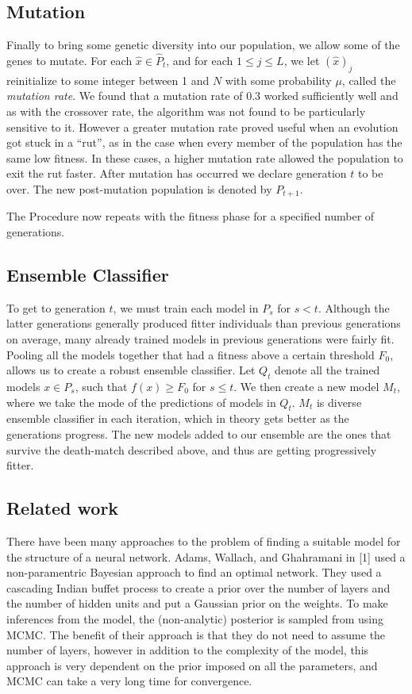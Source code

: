 \documentclass{article}
\DeclareMathOperator{\1}{\mathbbm{1}}
\begin{document}
\subsection{Mutation}
Finally to bring some genetic diversity into our population, we allow some of the genes to mutate.
For each $\hat{x}\in\hat{P}_t$, and for each $1\leq j\leq L$,
we let $(\hat{x})_j$ reinitialize to some integer between 1 and $N$ with some probability $\mu$,
called the \emph{mutation rate}. We found that a mutation rate of $0.3$ worked sufficiently well and
as with the crossover rate, the algorithm was not found to be particularly sensitive to it. However a greater mutation rate 
proved useful when an evolution got stuck in a ``rut'', as in the case when every member of the population has the same low fitness.
In these cases, a higher mutation rate allowed the population to exit the rut faster.
After mutation has occurred we declare generation $t$ to be over. The new post-mutation population is denoted by $P_{t+1}$.

The Procedure now repeats with the fitness phase for a specified number of generations.

\subsection{Ensemble Classifier}
To get to generation $t$, we must train each model in $P_s$ for $s<t$.
Although the latter generations generally produced fitter individuals than previous generations on average,
many already trained models in previous generations were fairly fit. 
Pooling all the models together that had a fitness above a certain threshold $F_0$, allows us to create a robust ensemble classifier.
Let $Q_t$ denote all the
trained models $x\in P_s$, such that $f(x)\geq F_0$ for $s\leq t$. We then create a new model $M_t$, 
where we take the mode of the predictions of models in $Q_t$. $M_t$ is diverse ensemble classifier in each iteration,
which in theory gets better as the generations progress. The new models added to our ensemble are the ones that survive
the death-match described above, and thus are getting progressively fitter.

\subsection{Related work}
There have been many approaches to the problem of finding a suitable model for the structure of a neural network. Adams, Wallach, and Ghahramani in [1] used a non-paramentric Bayesian approach to find an optimal network. They used a cascading Indian buffet process to create a prior over the number of layers and the number of hidden units and put a Gaussian prior on the weights. To make inferences from the model, the (non-analytic) posterior is sampled from using MCMC. The benefit of their approach is that they do not need to assume the number of layers, however in addition to the complexity of the model, this approach is very dependent on the prior imposed on all the parameters, and MCMC can take a very long time for convergence.
\end{document}
